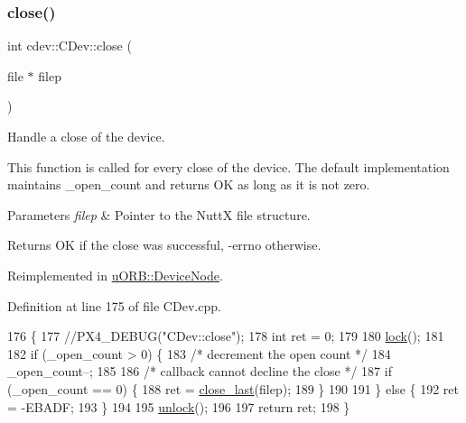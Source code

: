 \subsubsection{\texorpdfstring{close()}{close()}}
{\footnotesize\ttfamily int cdev\+::\+C\+Dev\+::close (\begin{DoxyParamCaption}\item[{file $\ast$}]{filep }\end{DoxyParamCaption})\hspace{0.3cm}{\ttfamily [virtual]}}

Handle a close of the device.

This function is called for every close of the device. The default implementation maintains \+\_\+open\+\_\+count and returns OK as long as it is not zero.


\begin{DoxyParams}{Parameters}
{\em filep} & Pointer to the NuttX file structure. \\
\hline
\end{DoxyParams}
\begin{DoxyReturn}{Returns}
OK if the close was successful, -\/errno otherwise. 
\end{DoxyReturn}


Reimplemented in \hyperlink{classuORB_1_1DeviceNode_a80ebf695636c701d3378525b6d0e4148}{u\+O\+R\+B\+::\+Device\+Node}.



Definition at line 175 of file C\+Dev.\+cpp.


\begin{DoxyCode}
176 \{
177     \textcolor{comment}{//PX4\_DEBUG("CDev::close");}
178     \textcolor{keywordtype}{int} ret = 0;
179 
180     \hyperlink{classcdev_1_1CDev_ae676cccee31dd393ab681414a146d868}{lock}();
181 
182     \textcolor{keywordflow}{if} (\_open\_count > 0) \{
183         \textcolor{comment}{/* decrement the open count */}
184         \_open\_count--;
185 
186         \textcolor{comment}{/* callback cannot decline the close */}
187         \textcolor{keywordflow}{if} (\_open\_count == 0) \{
188             ret = \hyperlink{classcdev_1_1CDev_ae2fb43c7b0884dcbc6fbf1aa90d50a38}{close\_last}(filep);
189         \}
190 
191     \} \textcolor{keywordflow}{else} \{
192         ret = -EBADF;
193     \}
194 
195     \hyperlink{classcdev_1_1CDev_af65273e0578b277deea057dc7d558e9d}{unlock}();
196 
197     \textcolor{keywordflow}{return} ret;
198 \}
\end{DoxyCode}
\mbox{\label{classcdev_1_1CDev_ae2fb43c7b0884dcbc6fbf1aa90d50a38}} 
